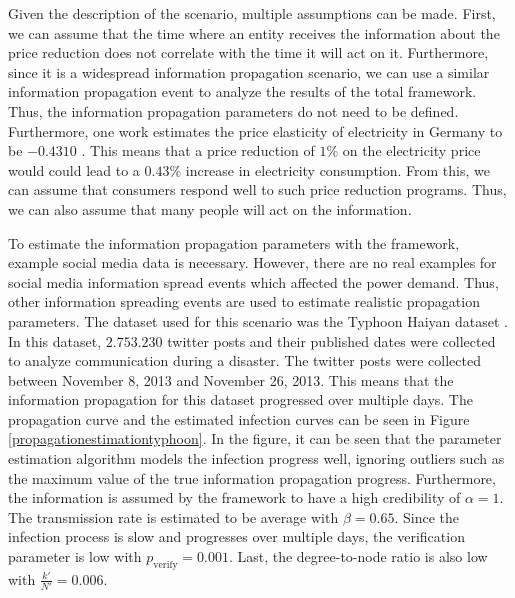 Given the description of the scenario, multiple assumptions can be made.
First, we can assume that the time where an entity receives the information
about the price reduction does not correlate with the time it will act on
it. Furthermore, since it is a widespread information propagation scenario,
we can use a similar information propagation event to analyze the 
results of the total framework. Thus, the information propagation
parameters do not need to be defined. Furthermore, one work estimates 
the price elasticity of electricity in Germany to be $-0.4310$
\cite{priceelasticity}. 
This means that a price reduction of $1\%$
on the electricity price would could lead to a $0.43\%$ increase in
electricity consumption. From this, we can assume that consumers 
respond well to such price reduction programs. Thus, we can also assume 
that many people will act on the information.

To estimate the information propagation parameters with the framework,
example social media data is necessary. However, there are no real examples
for social media information spread events which affected the power demand.
Thus, other information spreading events are used to estimate 
realistic propagation parameters. The dataset used for this scenario
was the Typhoon Haiyan dataset \cite{david2016tweeting}. In this
dataset, $2.753.230$ twitter posts and their published dates were collected
to analyze communication during a disaster. The twitter posts were collected
between November 8, 2013 and November 26, 2013. This means that the 
information propagation for this dataset progressed over multiple days.
The propagation curve and the estimated infection curves can be seen in 
Figure \ref{propagationestimationtyphoon}. In the figure, it can be seen 
that the parameter estimation algorithm models the infection progress
well, ignoring outliers such as the maximum value of the true information
propagation progress. Furthermore, the
information is assumed by the framework to have a high credibility 
of $\alpha=1$. The transmission rate is estimated to be average with 
$\beta=0.65$.
Since the infection process is slow and progresses over 
multiple days, the verification parameter is
low with $p_{\mathrm{verify}}=0.001$. Last, the degree-to-node ratio
is also low with $\frac{k'}{N'}=0.006$.


